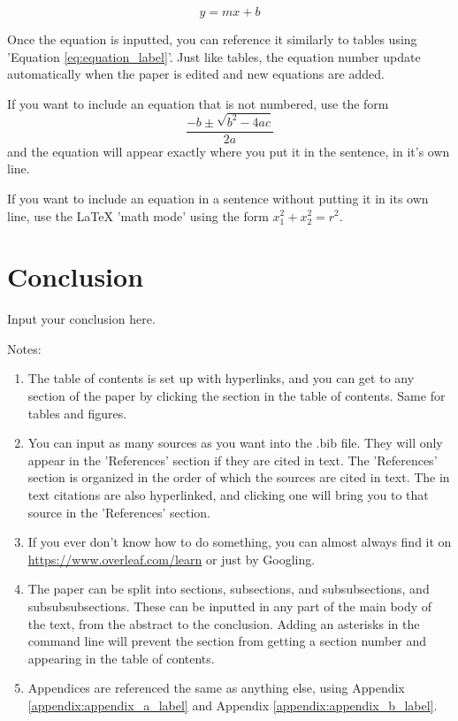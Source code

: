 \documentclass{article}
\begin{document}
\begin{doublespacing}
\begin{equation} 
    y=mx+b
    \label{eq:equation_label}
\end{equation}

\par Once the equation is inputted, you can reference it similarly to tables using 'Equation \ref{eq:equation_label}'. Just like tables, the equation number update automatically when the paper is edited and new equations are added. 

\par If you want to include an equation that is not numbered, use the form $$\frac{-b\pm \sqrt{b^{2}-4ac}}{2a}$$ and the equation will appear exactly where you put it in the sentence, in it's own line. 

\par If you want to include an equation in a sentence without putting it in its own line, use the LaTeX 'math mode' using the form $x_{1}^{2}+x_{2}^{2}=r^{2}$. 


\section{Conclusion}

\noindent Input your conclusion here. 

\par Notes: 
\begin{enumerate}
    \item The table of contents is set up with hyperlinks, and you can get to any section of the paper by clicking the section in the table of contents. Same for tables and figures. 
    \item You can input as many sources as you want into the .bib file. They will only appear in the 'References' section if they are cited in text. The 'References' section is organized in the order of which the sources are cited in text. The in text citations are also hyperlinked, and clicking one will bring you to that source in the 'References' section. 
    \item If you ever don't know how to do something, you can almost always find it on \url{https://www.overleaf.com/learn} or just by Googling. 
    \item The paper can be split into sections, subsections, and subsubsections, and subsubsubsections. These can be inputted in any part of the main body of the text, from the abstract to the conclusion. Adding an asterisks in the command line will prevent the section from getting a section number and appearing in the table of contents.
    \item Appendices are referenced the same as anything else, using Appendix \ref{appendix:appendix_a_label} and Appendix \ref{appendix:appendix_b_label}.
\end{enumerate}


\end{doublespacing}
\end{document}

